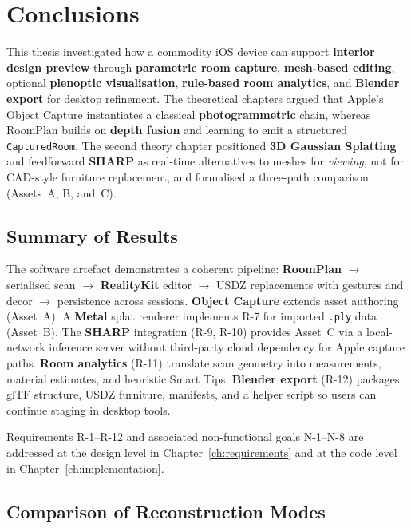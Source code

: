 \chapter{Conclusions}
\label{ch:conclusions}

This thesis investigated how a commodity iOS device can support \textbf{interior design preview} through \textbf{parametric room capture}, \textbf{mesh-based editing}, optional \textbf{plenoptic visualisation}, \textbf{rule-based room analytics}, and \textbf{Blender export} for desktop refinement. The theoretical chapters argued that Apple's Object Capture instantiates a classical \textbf{photogrammetric} chain, whereas RoomPlan builds on \textbf{depth fusion} and learning to emit a structured \texttt{CapturedRoom}. The second theory chapter positioned \textbf{3D Gaussian Splatting} \cite{kerbl20233dgs} and feedforward \textbf{SHARP} as real-time alternatives to meshes for \emph{viewing}, not for CAD-style furniture replacement, and formalised a three-path comparison (Assets~A, B, and~C).

\section{Summary of Results}

The software artefact demonstrates a coherent pipeline: \textbf{RoomPlan} $\rightarrow$ serialised scan $\rightarrow$ \textbf{RealityKit} editor $\rightarrow$ USDZ replacements with gestures and decor $\rightarrow$ persistence across sessions. \textbf{Object Capture} extends asset authoring (Asset~A). A \textbf{Metal} splat renderer implements R-7 for imported \texttt{.ply} data (Asset~B). The \textbf{SHARP} integration (R-9, R-10) provides Asset~C via a local-network inference server without third-party cloud dependency for Apple capture paths. \textbf{Room analytics} (R-11) translate scan geometry into measurements, material estimates, and heuristic Smart Tips. \textbf{Blender export} (R-12) packages glTF structure, USDZ furniture, manifests, and a helper script so users can continue staging in desktop tools.

Requirements R-1--R-12 and associated non-functional goals N-1--N-8 are addressed at the design level in Chapter~\ref{ch:requirements} and at the code level in Chapter~\ref{ch:implementation}.

\section{Comparison of Reconstruction Modes}

